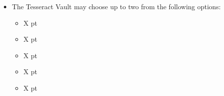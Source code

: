 \begin{minipage}[t]{0.72\textwidth}
\begin{itemize}
\begin{itemize}
			\item {} \dotfill X pt
			\item {} \dotfill X pt
			\item {} \dotfill X pt
			\item {} \dotfill X pt
			\item {} \dotfill X pt
		\end{itemize}
		\item The Tesseract Vault may choose up to two from the following options:
		\begin{itemize}
			\item {} \dotfill X pt
			\item {} \dotfill X pt
			\item {} \dotfill X pt
			\item {} \dotfill X pt
			\item {} \dotfill X pt
		\end{itemize}
	\end{itemize}
\end{minipage}



\newpage
\subsubsection[Transcendent C'Tan]{}

